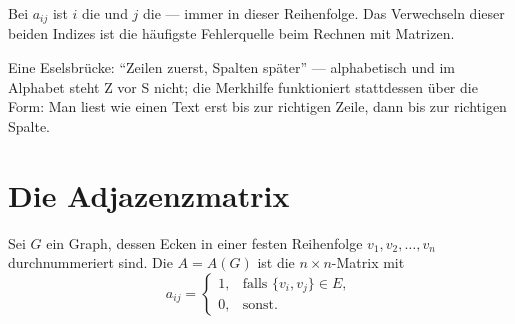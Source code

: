 \begin{warnung}
Bei $a_{ij}$ ist $i$ die  und $j$ die  --- immer in dieser Reihenfolge. Das Verwechseln dieser beiden Indizes ist die häufigste Fehlerquelle beim Rechnen mit Matrizen.

Eine Eselsbrücke: \enquote{Zeilen zuerst, Spalten später} --- alphabetisch und im Alphabet steht Z vor S nicht; die Merkhilfe funktioniert stattdessen über die Form: Man liest wie einen Text erst  bis zur richtigen Zeile, dann  bis zur richtigen Spalte.
\end{warnung}

\section{Die Adjazenzmatrix}

\begin{definition}
Sei $G$ ein Graph, dessen Ecken in einer festen Reihenfolge $v_1, v_2, \ldots, v_n$ durchnummeriert sind. Die  $A = A(G)$ ist die $n \times n$-Matrix mit
\[ a_{ij} = \begin{cases} 1, & \text{falls } \{v_i, v_j\} \in E, \\[2pt] 0, & \text{sonst.} \end{cases} \]
\end{definition}

